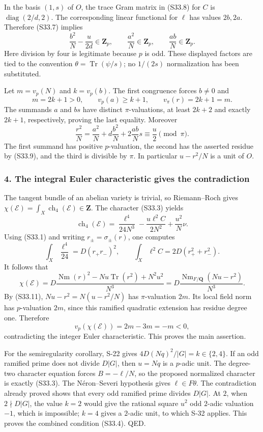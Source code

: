 In the basis \((1,s)\) of \(O\), the trace Gram matrix in (S33.8) for \(C\) is \(\operatorname{diag}(2/d,2)\). The corresponding linear functional for \(\ell\) has values \(2b,2a\). Therefore (S33.7) implies \[
 \frac{b^2}{N}-\frac{u}{2d}\in\mathbf Z_p,
 \qquad \frac{a^2}{N}\in\mathbf Z_p,
 \qquad \frac{ab}{N}\in\mathbf Z_p.
 \tag{S33.9}
\] Here division by four is legitimate because \(p\) is odd. These displayed factors are tied to the convention \(\theta=\operatorname{Tr}(\psi/s)\); no \(1/(2s)\) normalization has been substituted.

Let \(m=v_p(N)\) and \(k=v_p(b)\). The first congruence forces \(b\ne0\) and \[
 m=2k+1>0,
 \qquad v_p(a)\ge k+1,
 \qquad v_\pi(r)=2k+1=m.
 \tag{S33.10}
\] The summands \(a\) and \(bs\) have distinct \(\pi\)-valuations, at least \(2k+2\) and exactly \(2k+1\), respectively, proving the last equality. Moreover \[
 \frac{r^2}{N}
 =\frac{a^2}{N}+d\frac{b^2}{N}
             +2\frac{ab}{N}s
 \equiv\frac u2\pmod\pi.
 \tag{S33.11}
\] The first summand has positive \(p\)-valuation, the second has the asserted residue by (S33.9), and the third is divisible by \(\pi\). In particular \(u-r^2/N\) is a unit of \(O\).

\subsubsection{4. The integral Euler characteristic gives the contradiction}\label{the-integral-euler-characteristic-gives-the-contradiction}

The tangent bundle of an abelian variety is trivial, so Riemann--Roch gives \(\chi(\mathcal E)=\int_X\operatorname{ch}_4(\mathcal E)\in\mathbf Z\). The character (S33.3) yields \[
 \operatorname{ch}_4(\mathcal E)
 =\frac{\ell^4}{24N^3}
       -\frac{u\ell^2C}{2N^2}+\frac{u^2}{N}\nu.
\] Using (S33.1) and writing \(r_\pm=\sigma_\pm(r)\), one computes \[
 \int_X\frac{\ell^4}{24}=D(r_+r_-)^2,
 \qquad
 \int_X\ell^2C=2D(r_+^2+r_-^2).
\] It follows that \[
 \chi(\mathcal E)
 =D\frac{\operatorname{Nm}(r)^2-Nu\operatorname{Tr}(r^2)+N^2u^2}{N^3}
 =D\frac{\operatorname{Nm}_{F/\mathbf Q}(Nu-r^2)}{N^3}.
 \tag{S33.12}
\] By (S33.11), \(Nu-r^2=N(u-r^2/N)\) has \(\pi\)-valuation \(2m\). Its local field norm has \(p\)-valuation \(2m\), since this ramified quadratic extension has residue degree one. Therefore \[
 v_p(\chi(\mathcal E))=2m-3m=-m<0,
 \tag{S33.13}
\] contradicting the integer Euler characteristic. This proves the main assertion.

For the semiregularity corollary, S-22 gives \(4D(Nq)^2/|G|=k\in\{2,4\}\). If an odd ramified prime does not divide \(D|G|\), then \(u=Nq\) is a \(p\)-adic unit. The degree-two character equation forces \(B=-\ell/N\), so the proposed normalized character is exactly (S33.3). The Néron--Severi hypothesis gives \(\ell\in F\theta\). The contradiction already proved shows that every odd ramified prime divides \(D|G|\). At \(2\), when \(2\nmid D|G|\), the value \(k=2\) would give the rational square \(u^2\) odd \(2\)-adic valuation \(-1\), which is impossible; \(k=4\) gives a \(2\)-adic unit, to which S-32 applies. This proves the combined condition (S33.4). QED.

